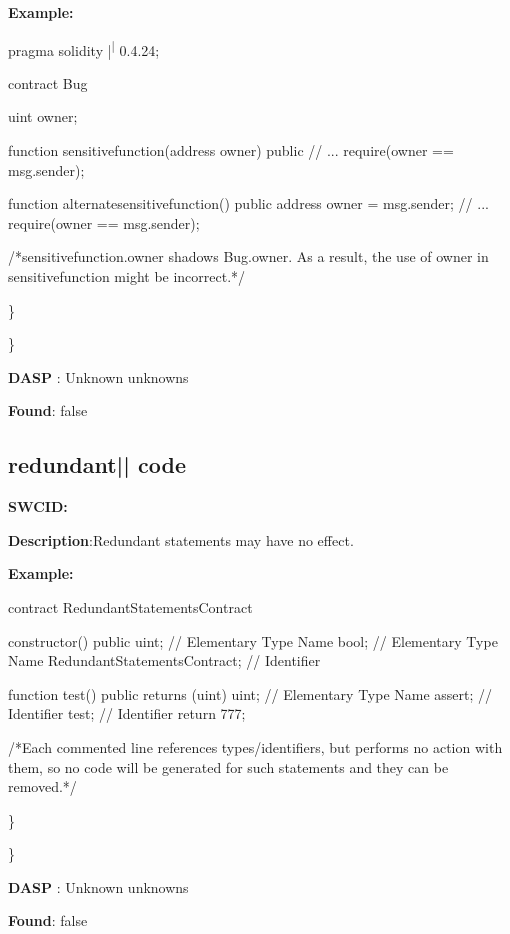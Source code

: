 \documentclass{article}
\begin{document}
\textbf{Example:} 
\begin{ffcode} 

pragma solidity |\textsuperscript| 0.4.24;

contract Bug {
    uint owner;

    function sensitive\textunderscore function(address owner) public {
        // ...
        require(owner == msg.sender);
    }

    function alternate\textunderscore sensitive\textunderscore function() public {
        address owner = msg.sender;
        // ...
        require(owner == msg.sender);
    }
}

 /*sensitive\textunderscore function.owner shadows Bug.owner. As a result, the use of owner in sensitive\textunderscore function might be incorrect.*/ 

\end{ffcode} 
\} 

\} 

\textbf{DASP} : Unknown unknowns

\textbf{Found}: false

\subsection{redundant{|\textunderscore| }code} 
\textbf{SWC{\textunderscore }ID:} 

\textbf{Description}:Redundant statements may have no effect.


\textbf{Example:} 
\begin{ffcode} 

contract RedundantStatementsContract {

    constructor() public {
        uint; // Elementary Type Name
        bool; // Elementary Type Name
        RedundantStatementsContract; // Identifier
    }

    function test() public returns (uint) {
        uint; // Elementary Type Name
        assert; // Identifier
        test; // Identifier
        return 777;
    }
}

 /*Each commented line references types/identifiers, but performs no action with them, so no code will be generated for such statements and they can be removed.*/ 

\end{ffcode} 
\} 

\} 

\textbf{DASP} : Unknown unknowns

\textbf{Found}: false
\end{document}
